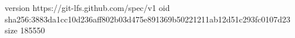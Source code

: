 version https://git-lfs.github.com/spec/v1
oid sha256:3883da1cc10d236aff802b03d475e891369b50221211ab12d51c293fc0107d23
size 185550

